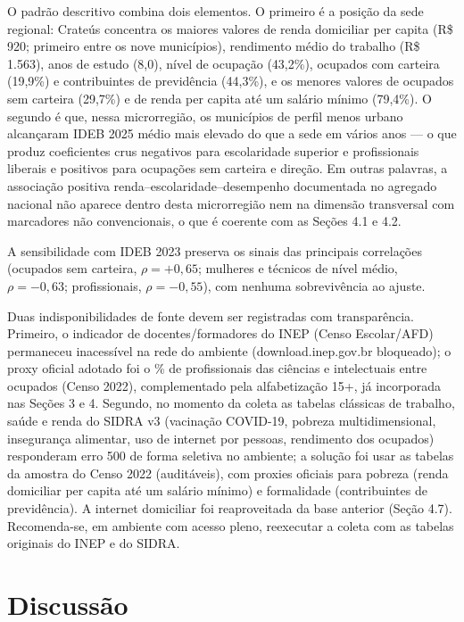 \documentclass[12pt,a4paper]{article}
\begin{document}
O padrão descritivo combina dois elementos. O primeiro é a posição da sede regional: Crateús concentra os maiores valores de renda domiciliar per capita (R\$ 920; primeiro entre os nove municípios), rendimento médio do trabalho (R\$ 1.563), anos de estudo (8,0), nível de ocupação (43,2\%), ocupados com carteira (19,9\%) e contribuintes de previdência (44,3\%), e os menores valores de ocupados sem carteira (29,7\%) e de renda per capita até um salário mínimo (79,4\%). O segundo é que, nessa microrregião, os municípios de perfil menos urbano alcançaram IDEB 2025 médio mais elevado do que a sede em vários anos --- o que produz coeficientes crus negativos para escolaridade superior e profissionais liberais e positivos para ocupações sem carteira e direção. Em outras palavras, a associação positiva renda--escolaridade--desempenho documentada no agregado nacional não aparece dentro desta microrregião nem na dimensão transversal com marcadores não convencionais, o que é coerente com as Seções 4.1 e 4.2.

A sensibilidade com IDEB 2023 preserva os sinais das principais correlações (ocupados sem carteira, $\rho = +0{,}65$; mulheres e técnicos de nível médio, $\rho = -0{,}63$; profissionais, $\rho = -0{,}55$), com nenhuma sobrevivência ao ajuste.

Duas indisponibilidades de fonte devem ser registradas com transparência. Primeiro, o indicador de docentes/formadores do INEP (Censo Escolar/AFD) permaneceu inacessível na rede do ambiente (download.inep.gov.br bloqueado); o proxy oficial adotado foi o \% de profissionais das ciências e intelectuais entre ocupados (Censo 2022), complementado pela alfabetização 15+, já incorporada nas Seções 3 e 4. Segundo, no momento da coleta as tabelas clássicas de trabalho, saúde e renda do SIDRA v3 (vacinação COVID-19, pobreza multidimensional, insegurança alimentar, uso de internet por pessoas, rendimento dos ocupados) responderam erro 500 de forma seletiva no ambiente; a solução foi usar as tabelas da amostra do Censo 2022 (auditáveis), com proxies oficiais para pobreza (renda domiciliar per capita até um salário mínimo) e formalidade (contribuintes de previdência). A internet domiciliar foi reaproveitada da base anterior (Seção 4.7). Recomenda-se, em ambiente com acesso pleno, reexecutar a coleta com as tabelas originais do INEP e do SIDRA.

\section{Discussão}
\end{document}
